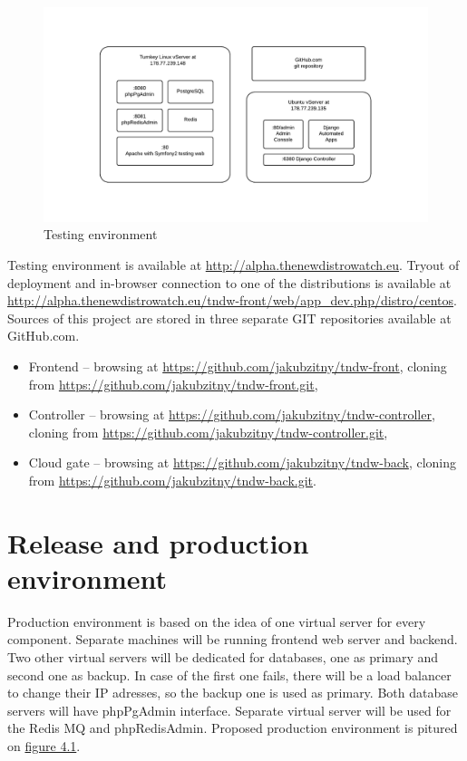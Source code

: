 \documentclass[thesis=B,english]{FITthesis}[2013/04/26]
\begin{document}
\begin{figure}[h!]
	\includegraphics[trim=2.5cm 2cm 3cm 2cm, clip=true, totalheight=190pt]{images/tndw-test.pdf}
	\caption{Testing environment}
	\label{fig: tndw-test}
\end{figure}

Testing environment is available at \url{http://alpha.thenewdistrowatch.eu}. Tryout of deployment and in-browser connection to one of the distributions is available at \url{http://alpha.thenewdistrowatch.eu/tndw-front/web/app_dev.php/distro/centos}. \\

Sources of this project are stored in three separate GIT repositories available at GitHub.com.

\begin{itemize}
	\item Frontend -- browsing at \url{https://github.com/jakubzitny/tndw-front}, cloning from \url{https://github.com/jakubzitny/tndw-front.git},
	\item Controller -- browsing at \url{https://github.com/jakubzitny/tndw-controller}, cloning from \url{https://github.com/jakubzitny/tndw-controller.git},
	\item Cloud gate -- browsing at \url{https://github.com/jakubzitny/tndw-back}, cloning from \url{https://github.com/jakubzitny/tndw-back.git}.
\end{itemize}

\chapter{Release and production environment}
\label{chapter:producion}

Production environment is based on the idea of one virtual server for every component. Separate machines will be running frontend web server and backend. Two other virtual servers will be dedicated for databases, one as primary and second one as backup. In case of the first one fails, there will be a load balancer to change their IP adresses, so the backup one is used as primary. Both database servers will have phpPgAdmin interface. Separate virtual server will be used for the Redis MQ and phpRedisAdmin. Proposed production environment is pitured on \hyperref[fig:tndw-prod]{figure 4.1}. \\
\end{document}
